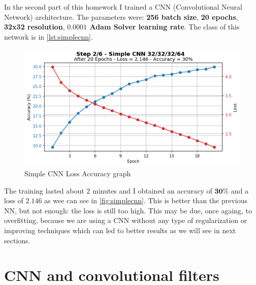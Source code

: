 \documentclass[a4paper, 11pt]{article}
\begin{document}
	
	In the second part of this homework I trained a CNN (Convolutional Neural Network) architecture. The parameters were: \textbf{256 batch size}, \textbf{20 epochs}, \textbf{32x32 resolution}, \textbf{$\boldsymbol{0.0001}$ Adam Solver learning rate}. The class of this network is in \vref{lst:simplecnn}.
	
	\newpage
	\begin{figure}[ht!]
		\centering
		\includegraphics[width=0.65\paperwidth]{img/fig02.png}
		\caption{Simple CNN Loss Accuracy graph}
		\label{fig:simplecnn}
	\end{figure}

	The training lasted about 2 minutes and I obtained an accuracy of $\boldsymbol{30\%}$ and a loss of $2.146$ as wee can see in \vref{fig:simplecnn}.
	This is better than the previous NN, but not enough: the loss is still too high. This may be due, once againg, to overfitting, because we are using a CNN without any type of regularization or improving techniques which can led to better results as we will see in next sections.
	
	
	\section{CNN and convolutional filters}
	
\end{document}
